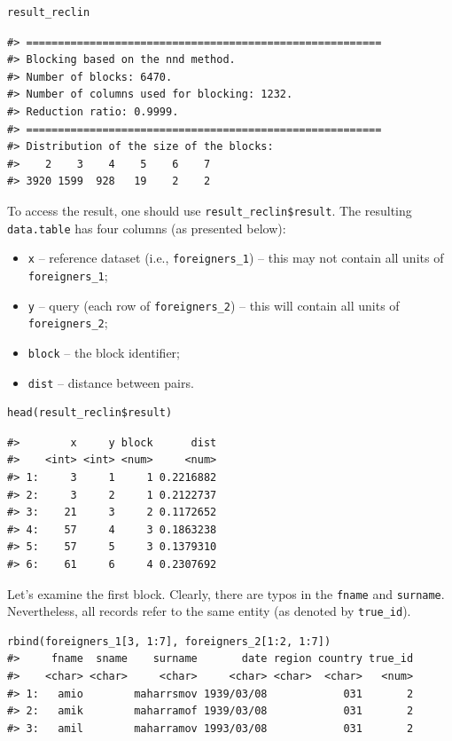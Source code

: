 \begin{verbatim}
result_reclin
\end{verbatim}

\begin{verbatim}
#> ========================================================
#> Blocking based on the nnd method.
#> Number of blocks: 6470.
#> Number of columns used for blocking: 1232.
#> Reduction ratio: 0.9999.
#> ========================================================
#> Distribution of the size of the blocks:
#>    2    3    4    5    6    7 
#> 3920 1599  928   19    2    2
\end{verbatim}

To access the result, one should use \texttt{result\_reclin\$result}. The
resulting \texttt{data.table} has four columns (as presented below):

\begin{itemize}
\tightlist
\item
  \texttt{x} -- reference dataset (i.e., \texttt{foreigners\_1}) -- this may not
  contain all units of \texttt{foreigners\_1};
\item
  \texttt{y} -- query (each row of \texttt{foreigners\_2}) -- this will contain all
  units of \texttt{foreigners\_2};
\item
  \texttt{block} -- the block identifier;
\item
  \texttt{dist} -- distance between pairs.
\end{itemize}


\begin{verbatim}
head(result_reclin$result)
\end{verbatim}

\begin{verbatim}
#>        x     y block      dist
#>    <int> <int> <num>     <num>
#> 1:     3     1     1 0.2216882
#> 2:     3     2     1 0.2122737
#> 3:    21     3     2 0.1172652
#> 4:    57     4     3 0.1863238
#> 5:    57     5     3 0.1379310
#> 6:    61     6     4 0.2307692
\end{verbatim}

Let's examine the first block. Clearly, there are typos in the \texttt{fname}
and \texttt{surname}. Nevertheless, all records refer to the same entity (as
denoted by \texttt{true\_id}).


\begin{verbatim}
rbind(foreigners_1[3, 1:7], foreigners_2[1:2, 1:7])
#>     fname  sname    surname       date region country true_id
#>    <char> <char>     <char>     <char> <char>  <char>   <num>
#> 1:   amio        maharrsmov 1939/03/08            031       2
#> 2:   amik        maharramof 1939/03/08            031       2
#> 3:   amil        maharramov 1993/03/08            031       2
\end{verbatim}

